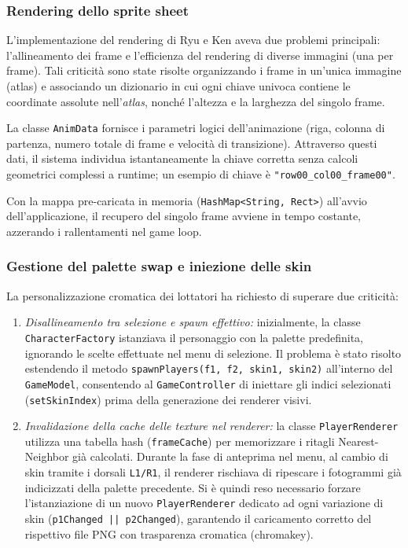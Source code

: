 \documentclass[11pt, a4paper]{article}
\begin{document}
	\subsubsection{Rendering dello sprite sheet}
	L'implementazione del rendering di Ryu e Ken aveva due problemi principali: l'allineamento dei frame e l'efficienza del rendering di diverse immagini (una per frame). Tali criticità sono state risolte organizzando i frame in un'unica immagine (atlas) e associando un dizionario in cui ogni chiave univoca contiene le coordinate assolute nell'\textit{atlas}, nonché l'altezza e la larghezza del singolo frame.
	
	La classe \texttt{AnimData} fornisce i parametri logici dell'animazione (riga, colonna di partenza, numero totale di frame e velocità di transizione). Attraverso questi dati, il sistema individua istantaneamente la chiave corretta senza calcoli geometrici complessi a runtime; un esempio di chiave è \texttt{"row00\_col00\_frame00"}. 
	
	Con la mappa pre-caricata in memoria (\texttt{HashMap<String, Rect>}) all'avvio dell'applicazione, il recupero del singolo frame avviene in tempo costante, azzerando i rallentamenti nel game loop.
	
	\subsubsection{Gestione del palette swap e iniezione delle skin}
	La personalizzazione cromatica dei lottatori ha richiesto di superare due criticità:
	\begin{enumerate}
		\item \emph{Disallineamento tra selezione e spawn effettivo:} inizialmente, la classe \texttt{CharacterFactory} istanziava il personaggio con la palette predefinita, ignorando le scelte effettuate nel menu di selezione. Il problema è stato risolto estendendo il metodo \texttt{spawnPlayers(f1, f2, skin1, skin2)} all'interno del \texttt{GameModel}, consentendo al \texttt{GameController} di iniettare gli indici selezionati (\texttt{setSkinIndex}) prima della generazione dei renderer visivi.
		\item \emph{Invalidazione della cache delle texture nel renderer:} la classe \texttt{PlayerRenderer} utilizza una tabella hash (\texttt{frameCache}) per memorizzare i ritagli Nearest-Neighbor già calcolati. Durante la fase di anteprima nel menu, al cambio di skin tramite i dorsali \texttt{L1/R1}, il renderer rischiava di ripescare i fotogrammi già indicizzati della palette precedente. Si è quindi reso necessario forzare l'istanziazione di un nuovo \texttt{PlayerRenderer} dedicato ad ogni variazione di skin (\texttt{p1Changed || p2Changed}), garantendo il caricamento corretto del rispettivo file PNG con trasparenza cromatica (chromakey).
	\end{enumerate}
	
\end{document}
